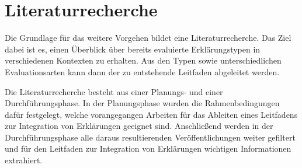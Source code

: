 \chapter{Literaturrecherche}
\label{sec:literature_review}

Die Grundlage für das weitere Vorgehen bildet eine Literaturrecherche. Das Ziel dabei ist es, einen Überblick über bereits evaluierte Erklärungstypen in verschiedenen Kontexten zu erhalten. Aus den Typen sowie unterschiedlichen Evaluationsarten kann dann der zu entstehende Leitfaden abgeleitet werden.

Die Literaturrecherche besteht aus einer Planungs- und einer Durchführungsphase. In der Planungsphase wurden die Rahmenbedingungen dafür festgelegt, welche vorangegangen Arbeiten für das Ableiten eines Leitfadens zur Integration von Erklärungen geeignet sind. Anschließend werden in der Durchführungsphase alle daraus resultierenden Veröffentlichungen weiter gefiltert und für den Leitfaden zur Integration von Erklärungen wichtigen Informationen extrahiert.





